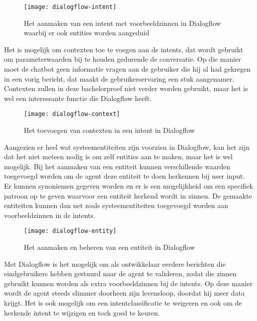 \begin{figure}[H]
    \label{fig:dialogflow-intent}
    \centering
    \texttt{[image: dialogflow-intent]}
    \caption{Het aanmaken van een intent met voorbeeldzinnen in Dialogflow waarbij er ook entities worden aangeduid}
\end{figure}

Het is mogelijk om contexten toe te voegen aan de intents, dat wordt gebruikt om parameterwaarden bij te houden gedurende de conversatie. Op die manier moet de chatbot geen informatie vragen aan de gebruiker die hij al had gekregen in een vorig bericht, dat maakt de gebruikerservaring een stuk aangenamer. Contexten zullen in deze bachelorproef niet verder worden gebruikt, maar het is wel een interessante functie die Dialogflow heeft.

\begin{figure}[H]
    \label{fig:dialogflow-context}
    \centering
    \texttt{[image: dialogflow-context]}
    \caption{Het toevoegen van contexten in een intent in Dialogflow}
\end{figure}

Aangezien er heel wat systeementiteiten zijn voorzien in Dialogflow, kan het zijn dat het niet meteen nodig is om zelf entities aan te maken, maar het is wel mogelijk. Bij het aanmaken van een entiteit kunnen verschillende waarden toegevoegd worden om de agent deze entiteit te doen herkennen bij user input. Er kunnen synoniemen gegeven worden en er is een mogelijkheid om een specifiek patroon op te geven waarvoor een entiteit herkend wordt in zinnen. De gemaakte entiteiten kunnen dan net zoals systeementiteiten toegevoegd worden aan voorbeeldzinnen in de intents.

\begin{figure}[H]
    \label{fig:dialogflow-entity}
    \centering
    \texttt{[image: dialogflow-entity]}
    \caption{Het aanmaken en beheren van een entiteit in Dialogflow}
\end{figure}

Met Dialogflow is het mogelijk om als ontwikkelaar eerdere berichten die eindgebruikers hebben gestuurd naar de agent te valideren, zodat die zinnen gebruikt kunnen worden als extra voorbeeldzinnen bij de intents. Op deze manier wordt de agent steeds slimmer doorheen zijn levensloop, doordat hij meer data krijgt. Het is ook mogelijk om een intentclassificatie te weigeren en ook om de herkende intent te wijzigen en toch goed te keuren. 

